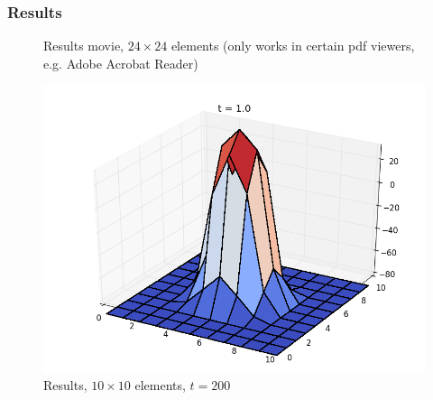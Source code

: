 \subsubsection{Results}
%
%
%


%
\begin{figure}[ht]
  \centering 
  
%  
%
%
  \caption{Results movie, $24 \times 24$ elements (only works in certain pdf viewers, e.g. Adobe Acrobat Reader)}
  \label{example-0402-current-run0-fig}
\end{figure}

\begin{figure}[ht]
  \centering 
  \includegraphics[width=0.9\columnwidth]{examples/example-0402/doc/figures/current_run_l1x1_n10x10_i1_s0_p1__t200.png} 
  \caption{Results, $10 \times 10$ elements, $t=200$}
  \label{example-0402-current-run1-fig}
\end{figure}

